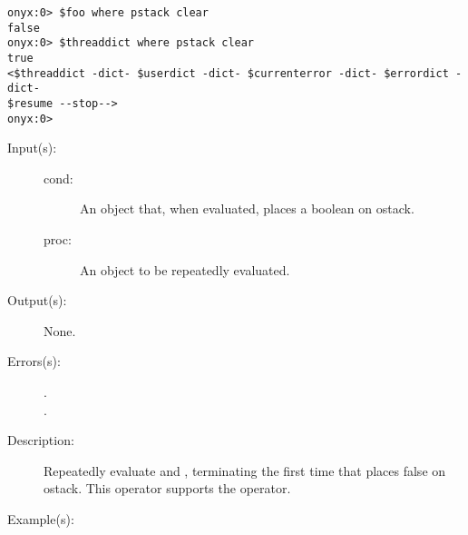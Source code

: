 \begin{description}
\begin{description}
\begin{verbatim}
onyx:0> $foo where pstack clear
false
onyx:0> $threaddict where pstack clear
true
<$threaddict -dict- $userdict -dict- $currenterror -dict- $errordict -dict-
$resume --stop-->
onyx:0>
		\end{verbatim}
	\end{description}
\label{systemdict:while}
\item[{\onyxop{cond proc}{while}{--}}: ]
	\begin{description}\item[]
	\item[Input(s): ]
		\begin{description}\item[]
		\item[cond: ]
			An object that, when evaluated, places a boolean on
			ostack.
		\item[proc: ]
			An object to be repeatedly evaluated.
		\end{description}
	\item[Output(s): ] None.
	\item[Errors(s): ]
		\begin{description}\item[]
		\item[.]
		\item[.]
		\end{description}
	\item[Description: ]
		Repeatedly evaluate  and , terminating
		the first time that  places false on ostack.  This
		operator supports the
		 operator.
	\item[Example(s): ]\begin{verbatim}


\end{verbatim}
\end{description}
\end{description}
